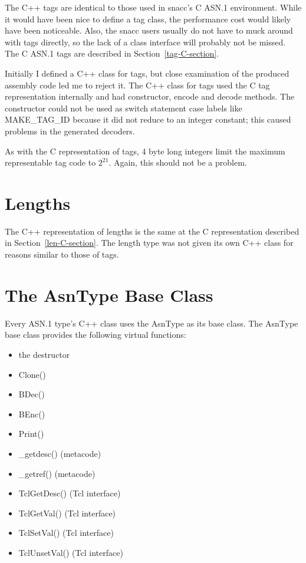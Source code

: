 The C++ tags are identical to those used in snacc's C ASN.1
environment.  While it would have been nice to define a tag class, the
performance cost would likely have been noticeable.  Also, the snacc
users usually do not have to muck around with tags directly, so the
lack of a class interface will probably not be missed.  The C ASN.1
tags are described in Section~\ref{tag-C-section}.

Initially I defined a C++ class for tags, but close examination of the
produced assembly code led me to reject it.  The C++ class for tags
used the C tag representation internally and had constructor, encode
and decode methods.  The constructor could not be used as
{\C switch} statement case labels like {\C MAKE\_TAG\_ID} because it
did not reduce to an integer constant; this caused problems in the
generated decoders.

As with the C representation of tags, 4 byte long integers limit the
maximum representable tag code to $2^{21}$.  Again, this should not be
a problem.


\section{\label{len-C++-section}Lengths}

The C++ representation of lengths is the same at the C representation
described in Section~\ref{len-C-section}.  The length type was not given
its own C++ class for reasons similar to those of tags.


\section{\label{asntype-C++-section}The AsnType Base Class}

Every ASN.1 type's C++ class uses the {\C AsnType} as its base class.
The {\C AsnType} base class provides the following virtual functions:
\begin{itemize}
  \item the destructor
  \item {\C Clone()}
  \item {\C BDec()}
  \item {\C BEnc()}
  \item {\C Print()}
  \item {\C \_getdesc()} (metacode)
  \item {\C \_getref()} (metacode)
  \item {\C TclGetDesc()} (Tcl interface)
  \item {\C TclGetVal()} (Tcl interface)
  \item {\C TclSetVal()} (Tcl interface)
  \item {\C TclUnsetVal()} (Tcl interface)
\end{itemize}

